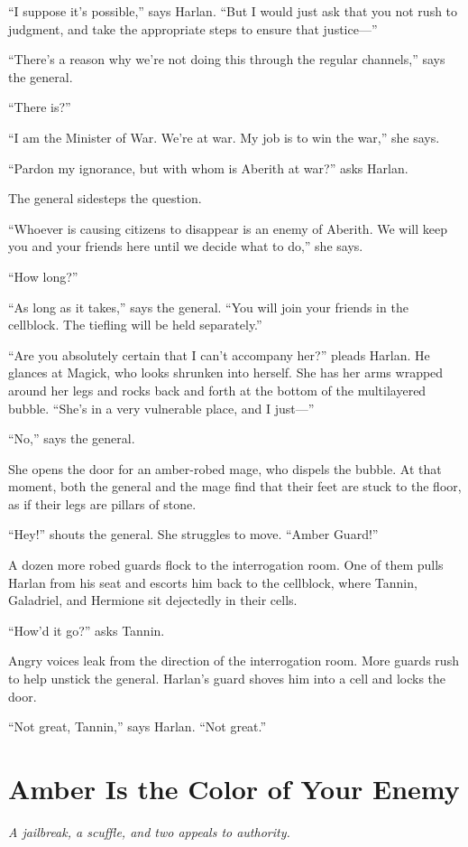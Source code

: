 \documentclass[smalldemyvopaper,11pt,twoside,onecolumn,openright,extrafontsizes]{memoir}
\newcommand{\chapdesc}[1]{
    \begin{flushright}
    \emph{{#1}}
    \end{flushright}
    \vspace{26pt}
}
\begin{document}
``I suppose it's possible,'' says Harlan. ``But I would just ask that
you not rush to judgment, and take the appropriate steps to ensure that
justice---''

``There's a reason why we're not doing this through the regular
channels,'' says the general.

``There is?''

``I am the Minister of War. We're at war. My job is to win the war,''
she says.

``Pardon my ignorance, but with whom is Aberith at war?'' asks Harlan.

The general sidesteps the question.

``Whoever is causing citizens to disappear is an enemy of Aberith. We
will keep you and your friends here until we decide what to do,'' she
says.

``How long?''

``As long as it takes,'' says the general. ``You will join your friends
in the cellblock. The tiefling will be held separately.''

``Are you absolutely certain that I can't accompany her?'' pleads
Harlan. He glances at Magick, who looks shrunken into herself. She has
her arms wrapped around her legs and rocks back and forth at the bottom
of the multilayered bubble. ``She's in a very vulnerable place, and I
just---''

``No,'' says the general.

She opens the door for an amber-robed mage, who dispels the bubble. At
that moment, both the general and the mage find that their feet are
stuck to the floor, as if their legs are pillars of stone.

``Hey!'' shouts the general. She struggles to move. ``Amber Guard!''

A dozen more robed guards flock to the interrogation room. One of them
pulls Harlan from his seat and escorts him back to the cellblock, where
Tannin, Galadriel, and Hermione sit dejectedly in their cells.

``How'd it go?'' asks Tannin.

Angry voices leak from the direction of the interrogation room. More
guards rush to help unstick the general. Harlan's guard shoves him into
a cell and locks the door.

``Not great, Tannin,'' says Harlan. ``Not great.''


\chapter{Amber Is the Color of Your Enemy}
\chapdesc{A jailbreak, a scuffle, and two appeals to authority.}
\end{document}
